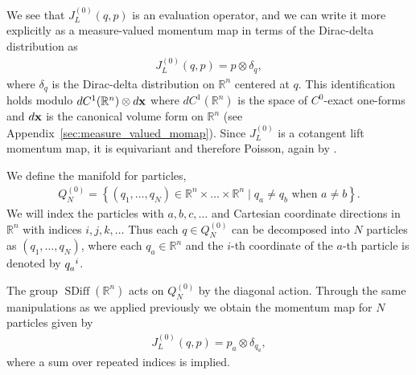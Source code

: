 \documentclass[12pt]{amsart}
\newcommand{\R}{\ensuremath{\mathbb{R}}}
\newcommand{\dx}{\ensuremath{\textrm{d}x}}
\DeclareMathOperator{\SDiff}{SDiff}
\begin{document}
We see that $J_L^{(0)}(q,p)$ is an evaluation operator, and we can write it 
more explicitly as a measure-valued momentum map in terms of the Dirac-delta distribution as
\begin{align*}
  J_L^{(0)}( q , p ) = p \otimes \delta_q,
\end{align*}
where $\delta_q$ is the Dirac-delta distribution on $\R^n$ centered at $q$.
This identification holds modulo $dC^1(\R^n) \otimes d{\bf x}$ where $dC^1(\R^n)$
is the space of $C^0$-exact one-forms and $d{\bf x}$ is the canonical volume form on $\R^n$
(see Appendix~\ref{sec:measure_valued_momap}).
Since $J_L^{(0)}$ is a cotangent lift momentum map, it is equivariant and therefore Poisson, again by \cite[Thm~12.4.9]{MandS}.

We define the manifold for particles,
\begin{align*}
  Q_N^{(0)} = \left\{ (q_1,\dots,q_N) \in \R^n \times \dots\times \R^n
                 \mid q_a \neq q_b \text{ when } a \neq b \right\}.
\end{align*}
We will index the particles with $a,b,c,\dots$ and Cartesian coordinate
directions in $\R^n$ with indices $i,j,k,\dots$
Thus each $q \in Q_N^{(0)}$ can be decomposed
into $N$ particles as $(q_1,\dots,q_N)$, where each $q_a \in \R^n$
and the $i$-th coordinate of the $a$-th particle
is denoted by $q\indices{_a^i}$.

The group $\SDiff(\R^n)$ acts on $Q_N^{(0)}$ by the diagonal action.
Through the same manipulations as we applied previously we obtain the
momentum map for $N$ particles given by
\begin{align*}
  J_L^{(0)}(q,p) = p_a \otimes \delta_{q_a},
\end{align*}
where a sum over repeated indices is implied.
\end{document}
